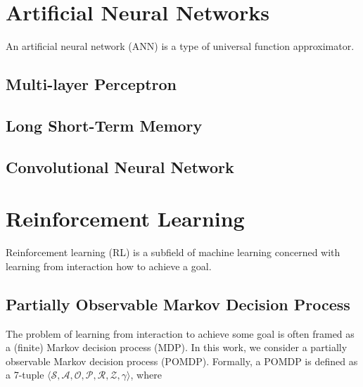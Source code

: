 
\section{Artificial Neural Networks}

An artificial neural network (ANN) is a type of universal function approximator.


\subsection{Multi-layer Perceptron}

\subsection{Long Short-Term Memory}


\subsection{Convolutional Neural Network}


\section{Reinforcement Learning}

Reinforcement learning (RL) is a subfield of machine learning concerned with learning from interaction how to achieve a goal.

\subsection{Partially Observable Markov Decision Process}

The problem of learning from interaction to achieve some goal is often framed as a (finite) Markov decision process (MDP).
In this work, we consider a partially observable Markov decision process (POMDP).
Formally, a POMDP is defined as a 7-tuple \(\langle \mathcal{S}, \mathcal{A}, \mathcal{O}, \mathcal{P}, \mathcal{R}, \mathcal{Z}, \gamma \rangle\), where

